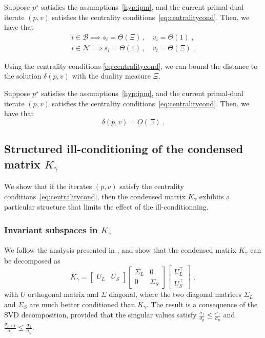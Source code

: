 \begin{proposition}
  \label{prop:cond:boundslack}
  Suppose $p^\star$ satisfies the assumptions~\ref{hyp:ipm},
  and the current primal-dual iterate $(p, v)$ satisfies the centrality
  conditions~\eqref{eq:centralitycond}. Then, we have that
  \begin{subequations}
    \begin{align}
      i \in \mathcal{B} \implies s_i = \Theta(\Xi) \, , \quad v_i = \Theta(1) \;, \\
      i \in \mathcal{N} \implies s_i = \Theta(1) \, , \quad v_i = \Theta(\Xi) \; .
    \end{align}
  \end{subequations}
\end{proposition}
Using the centrality conditions \eqref{eq:centralitycond}, we can bound
the distance to the solution $\delta(p, v)$ with the duality measure $\Xi$.
\begin{theorem}
  Suppose $p^\star$ satisfies the assumptions~\ref{hyp:ipm},
  and the current primal-dual iterate $(p, v)$ satisfies the centrality
  conditions~\eqref{eq:centralitycond}. Then, we have that
  \begin{equation}
    \delta(p, v) = O(\Xi) \; .
  \end{equation}
\end{theorem}

\subsection{Structured ill-conditioning of the condensed matrix $K_\gamma$}
We show that if the iterates $(p, v)$ satisfy
the centrality conditions~\eqref{eq:centralitycond}, then the
condensed matrix $K_\gamma$ exhibits a particular structure that limits
the effect of the ill-conditionning.

\subsubsection{Invariant subspaces in $K_\gamma$}
We follow the analysis presented in \cite{wright1998ill},
and show that the condensed matrix $K_\gamma$ can be decomposed as
\begin{equation}
  \label{eq:cond:svd}
  K_\gamma = \begin{bmatrix} U_L & U_S \end{bmatrix}
  \begin{bmatrix}
    \Sigma_L & 0 \\ 0 & \Sigma_S
  \end{bmatrix}
  \begin{bmatrix}
    U_L^\top \\ U_S^\top
  \end{bmatrix}
  \; ,
\end{equation}
with $U$ orthogonal matrix and $\Sigma$ diagonal, where
the two diagonal matrices $\Sigma_L$ and $\Sigma_S$ are much better conditioned than $K_\gamma$.
The result is a consequence of the SVD decomposition,
provided that the singular values satisfy $\frac{\sigma_1}{\sigma_{p}} \leq \frac{\sigma_1}{\sigma_n}$
and $\frac{\sigma_{p+1}}{\sigma_{n}} \leq \frac{\sigma_1}{\sigma_n}$.

